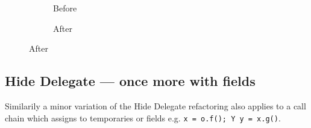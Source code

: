 \begin{figure}
  \centering
  \begin{subfigure}[b]{.4\linewidth}
    
    \caption{Before}
    \label{lst:HideDelegate-nofields-resource-refinity}
  \end{subfigure}\hspace{1cm}
  \begin{subfigure}[b]{.4\linewidth}
    
    \caption{After}
    \label{lst:HideDelegate-nofields-owner-refinity}
  \end{subfigure}
\label{lst:HideDelegate-nofields-classes-refinity}
\end{figure}

\subsection*{Hide Delegate --- once more with fields}

Similarily a minor variation of the  Hide Delegate refactoring also applies to a call chain which assigns to temporaries or fields
e.g. \lstinline[style=smallJava]|x = o.f(); Y y = x.g()|.




